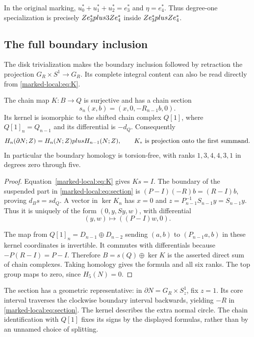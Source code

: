 In the original marking,
$u_0^*+u_1^*+u_2^*=e_3^*$ and $\eta=e_4^*$.
Thus degree-one specialization is precisely
$Z e_3^*plus3Z e_4^*$ inside
$Z e_3^*plusZ e_4^*$.

\subsection{The full boundary inclusion}

The disk trivialization makes the boundary inclusion followed by
retraction the projection $G_R\times S^1\to G_R$.
Its complete integral content can also be read directly from
\eqref{marked-local:eq:K}.

\begin{proposition}\label{marked-local:prop:boundary-splitting}
The chain map $K:B\to Q$ is surjective and has a chain section
\begin{equation}\label{marked-local:eq:section}
 s_n(x,b)=(x,0,-R_{n-1}b,0).
\end{equation}
Its kernel is isomorphic to the shifted chain complex $Q[1]$, where
$Q[1]_n=Q_{n-1}$ and its differential is $-d_Q$.
Consequently
\[
 H_n(\partial N;Z)=H_n(N;Z)plus H_{n-1}(N;Z),
 \qquad K_*\text{ is projection onto the first summand}.
\]
In particular the boundary homology is torsion-free, with ranks
$1,3,4,4,3,1$ in degrees zero through five.
\end{proposition}

\begin{proof}
Equation~\eqref{marked-local:eq:K} gives $Ks=I$. The boundary of the suspended
part in \eqref{marked-local:eq:section} is
$(P-I)(-R)b=(R-I)b$, proving $d_Bs=sd_Q$.
A vector in $\ker K_n$ has $x=0$ and
$z=P_{n-1}^{-1}S_{n-1}y=S_{n-1}y$. Thus it is uniquely of the
form $(0,y,Sy,w)$, with differential
\[
                    (y,w)\longmapsto((P-I)w,0).
\]

The map from $Q[1]_n=D_{n-1}\oplus D_{n-2}$ sending
$(a,b)$ to $(P_{n-1}a,b)$ in these kernel coordinates is invertible.
It commutes with differentials because $-P(R-I)=P-I$.
Therefore $B=s(Q)\oplus\ker K$ is the asserted direct sum of
chain complexes. Taking homology gives the formula and all six ranks.
The top group maps to zero, since $H_5(N)=0$.
\end{proof}

The section has a geometric representative: in
$\partial N=G_R\times S^1_z$, fix $z=1$. Its core interval
traverses the clockwise boundary interval backwards, yielding
$-R$ in \eqref{marked-local:eq:section}. The kernel describes the extra normal
circle. The chain identification with $Q[1]$ fixes its signs by the
displayed formulas, rather than by an unnamed choice of splitting.

